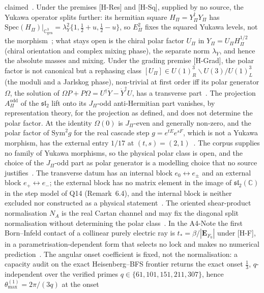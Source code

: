 \documentclass[11pt,a4paper]{article}
\begin{document}
    claimed~\cite{Beau2026pyl}.
    Under the premises [H-Res] and [H-Sq], supplied by no source, the Yukawa operator splits further: its hermitian
    square $H_\Pi = Y_\Pi^\dagger Y_\Pi$ has
    $\mathrm{Spec}(H_\Pi)|_{\mathbb{C}^3_{\mathrm{gen}}} = \lambda_Y^2\{1,\tfrac12+u,\tfrac12-u\}$, so $E_\Pi^2$ fixes
    the squared Yukawa levels, not the morphism~\cite{Beau2026pyo}; what stays open is the chiral polar factor
    $U_\Pi$ in $Y_\Pi = U_\Pi H_\Pi^{1/2}$ (chiral orientation and complex mixing phase), the separate norm
    $\lambda_Y$, and hence the absolute masses and mixing.
    Under the grading premise [H-Grad], the polar factor is not canonical but a rephasing class
    $[U_\Pi] \in U(1)^3_R \backslash U(3) / U(1)^3_L$ (the moduli and a Jarlskog phase), non-trivial at first order
    iff its polar generator $\Omega$, the solution of $\Omega P + P\Omega = U^\dagger \dot Y - \dot Y^\dagger U$, has a
    transverse part~\cite{Beau2026pyo}.
    The projection $A_\Pi^{\mathrm{odd}}$ of the $\mathfrak{sl}_2$ lift onto its $J_\Pi$-odd anti-Hermitian part
    vanishes, by representation theory, for the projection as defined, and does not determine the polar factor.
    At the identity $\Omega(0)$ is $J_\Pi$-even and generally non-zero, and the polar factor of $\mathrm{Sym}^2 g$
    for the real cascade step $g = e^{tE}e^{sF}$, which is not a Yukawa morphism, has the external entry $1/17$ at
    $(t,s) = (2,1)$~\cite{Beau2026pyo}.
    The corpus supplies no family of Yukawa morphisms, so the physical polar class is open, and the choice of the
    $J_\Pi$-odd part as polar generator is a modelling choice that no source justifies~\cite{Beau2026pyo}.
    The transverse datum has an internal block $e_0\leftrightarrow e_\pm$ and an external block
    $e_+\leftrightarrow e_-$; the external block has no matrix element in the image of $\mathfrak{sl}_2(\mathbb{C})$ in
    the step model of Q14 (Remark~6.4), and the internal block is neither excluded nor constructed as a physical
    statement~\cite{Beau2026pyo}.
    The oriented shear-product normalisation $N_A$ is the real Cartan channel and may fix the diagonal split normalisation without
    determining the polar class~\cite{Beau2026pyo}.
    In the A4-Note the first Born--Infeld contact of a collinear purely electric ray is
    $t_* = \beta/|\mathbf{E}_{F_0}|$ under [H-F], in a parametrisation-dependent form that selects no lock and makes
    no numerical prediction~\cite{Beau2026bim}.
    The angular onset coefficient is fixed, not the normalisation: a capacity audit on the exact Heisenberg--BFS
    frontier returns the exact onset $\tfrac13$, $q$-independent over the verified primes $q \in \{61,101,151,211,307\}$, hence $\theta_{\max}^{(1)} = 2\pi/(3q)$ at the onset
\end{document}

